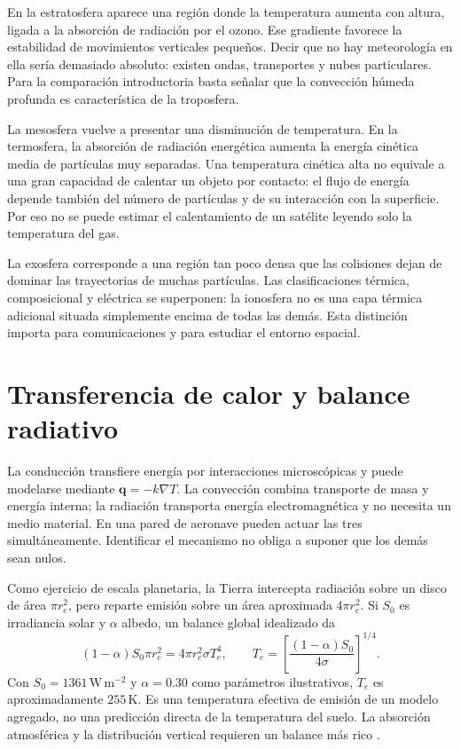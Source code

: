 En la estratosfera aparece una región donde la temperatura aumenta con altura, ligada a la absorción de radiación por el ozono. Ese gradiente favorece la estabilidad de movimientos verticales pequeños. Decir que no hay meteorología en ella sería demasiado absoluto: existen ondas, transportes y nubes particulares. Para la comparación introductoria basta señalar que la convección húmeda profunda es característica de la troposfera.

La mesosfera vuelve a presentar una disminución de temperatura. En la termosfera, la absorción de radiación energética aumenta la energía cinética media de partículas muy separadas. Una temperatura cinética alta no equivale a una gran capacidad de calentar un objeto por contacto: el flujo de energía depende también del número de partículas y de su interacción con la superficie. Por eso no se puede estimar el calentamiento de un satélite leyendo solo la temperatura del gas.

La exosfera corresponde a una región tan poco densa que las colisiones dejan de dominar las trayectorias de muchas partículas. Las clasificaciones térmica, composicional y eléctrica se superponen: la ionosfera no es una capa térmica adicional situada simplemente encima de todas las demás. Esta distinción importa para comunicaciones y para estudiar el entorno espacial.

\section{Transferencia de calor y balance radiativo}
La conducción transfiere energía por interacciones microscópicas y puede modelarse mediante $\boldsymbol{q}=-k\nabla T$. La convección combina transporte de masa y energía interna; la radiación transporta energía electromagnética y no necesita un medio material. En una pared de aeronave pueden actuar las tres simultáneamente. Identificar el mecanismo no obliga a suponer que los demás sean nulos.

Como ejercicio de escala planetaria, la Tierra intercepta radiación sobre un disco de área $\pi r_e^2$, pero reparte emisión sobre un área aproximada $4\pi r_e^2$. Si $S_0$ es irradiancia solar y $\alpha$ albedo, un balance global idealizado da
\begin{equation}
 (1-\alpha)S_0\pi r_e^2=4\pi r_e^2\sigma T_e^4,
 \qquad T_e=\left[\frac{(1-\alpha)S_0}{4\sigma}\right]^{1/4}.
\end{equation}
Con $S_0=1361\,\mathrm{W\,m^{-2}}$ y $\alpha=0.30$ como parámetros ilustrativos, $T_e$ es aproximadamente $255\,\mathrm{K}$. Es una temperatura efectiva de emisión de un modelo agregado, no una predicción directa de la temperatura del suelo. La absorción atmosférica y la distribución vertical requieren un balance más rico \cite{TAE2}.

